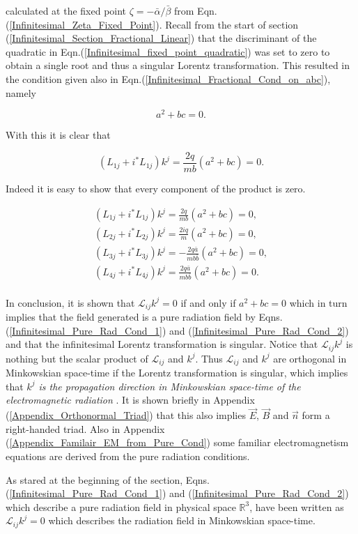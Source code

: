 \noindent calculated at the fixed point $\zeta = - \bar{\alpha} / {\bar{\beta}}$ from Eqn.(\ref{Infinitesimal_Zeta_Fixed_Point}). Recall from the start of section (\ref{Infinitesimal_Section_Fractional_Linear}) that the discriminant of the quadratic in Eqn.(\ref{Infinitesimal_fixed_point_quadratic}) was set to zero to obtain a single root and thus a singular Lorentz transformation. This resulted in the condition given also in Eqn.(\ref{Infinitesimal_Fractional_Cond_on_abc}), namely

\begin{equation*}   
a^2 + bc = 0.
\end{equation*}

\noindent With this it is clear that 

$$(L_{1j} + i ^*L_{1j}) k^j  = \frac{2q}{mb} (a^2 + bc) = 0.$$

\noindent Indeed it is easy to show that every component of the product is zero.

\begin{gather*}
(L_{1j} + i ^*L_{1j}) k^j  = \frac{2q}{mb} (a^2 + bc) = 0, \\
(L_{2j} + i ^*L_{2j}) k^j  = \frac{2iq}{m} (a^2 + bc) = 0, \\
(L_{3j} + i ^*L_{3j}) k^j  = -\frac{2q\bar{a}}{mb\bar{b}} (a^2 + bc) = 0, \\
(L_{4j} + i ^*L_{4j}) k^j  = \frac{2q\bar{a}}{mb\bar{b}} (a^2 + bc) = 0. \\
\end{gather*}

In conclusion, it is shown that $\mathcal{L}_{ij} k^j = 0$ if and only if $a^2 + bc = 0$ which in turn implies that the field generated is a pure radiation field by Eqns.(\ref{Infinitesimal_Pure_Rad_Cond_1}) and (\ref{Infinitesimal_Pure_Rad_Cond_2}) and that the infinitesimal Lorentz transformation is singular. Notice that $\mathcal{L}_{ij} k^j$ is nothing but the scalar product of $\mathcal{L}_{ij}$ and $k^j$. Thus $\mathcal{L}_{ij}$ and $k^j$ are orthogonal in Minkowskian space-time if the Lorentz transformation is singular, which implies that \textit{$k^j$ is the propagation direction in Minkowskian space-time of the electromagnetic radiation} \cite[p. 328]{Relativity_Synge}. It is shown briefly in Appendix (\ref{Appendix_Orthonormal_Triad}) that this also implies $\vec{E}$, $\vec{B}$ and $\vec{n}$ form a right-handed triad. Also in Appendix (\ref{Appendix_Familair_EM_from_Pure_Cond}) some familiar electromagnetism equations are derived from the pure radiation conditions.   

As stared at the beginning of the section, Eqns.(\ref{Infinitesimal_Pure_Rad_Cond_1}) and (\ref{Infinitesimal_Pure_Rad_Cond_2}) which describe a pure radiation field in physical space $\mathbb{R}^3$, have been written as $\mathcal{L}_{ij} k^j = 0$ which describes the radiation field in Minkowskian space-time.
   




  










